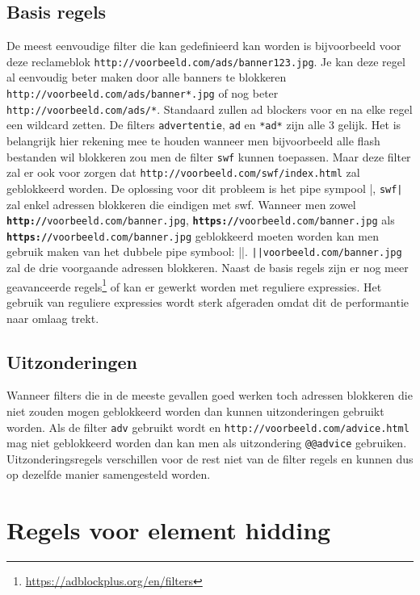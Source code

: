 \documentclass[pdftex,a4paper,12pt,twoside]{report}
\begin{document}
\subsection{Basis regels}
\label{sec Basis regels}
De meest eenvoudige filter die kan gedefinieerd kan worden is bijvoorbeeld voor deze reclameblok \texttt{http://voorbeeld.com/ads/banner123.jpg}. Je kan deze regel al eenvoudig beter maken door alle banners te blokkeren \texttt{http://voorbeeld.com/ads/banner*.jpg} of nog beter\texttt{ http://voorbeeld.com/ads/*}. Standaard zullen ad blockers voor en na elke regel een wildcard zetten. De filters \texttt{advertentie}, \texttt{ad} en \texttt{*ad*} zijn alle 3 gelijk. Het is belangrijk hier rekening mee te houden wanneer men bijvoorbeeld alle flash bestanden wil blokkeren zou men de filter \texttt{swf} kunnen toepassen. Maar deze filter zal er ook voor zorgen dat \texttt{http://voorbeeld.com/swf/index.html} zal geblokkeerd worden. De oplossing voor dit probleem is het pipe sympool |, \texttt{swf|} zal enkel adressen blokkeren die eindigen met swf. Wanneer men zowel \texttt{\textbf{http://}voorbeeld.com/banner.jpg}, \texttt{\textbf{https://}voorbeeld.com/banner.jpg} als \texttt{\textbf{https://}voorbeeld.com/banner.jpg} geblokkeerd moeten worden kan men gebruik maken van het dubbele pipe symbool: ||. \texttt{||voorbeeld.com/banner.jpg} zal de drie voorgaande adressen blokkeren.
Naast de basis regels zijn er nog meer geavanceerde regels\footnote{\url{https://adblockplus.org/en/filters}} of kan er gewerkt worden met reguliere expressies. Het gebruik van reguliere expressies wordt sterk afgeraden omdat dit de performantie naar omlaag trekt.
\subsection{Uitzonderingen}
\label{sec Uitzonderingen}
Wanneer filters die in de meeste gevallen goed werken toch adressen blokkeren die niet zouden mogen geblokkeerd worden dan kunnen uitzonderingen gebruikt worden. Als de filter \texttt{adv} gebruikt wordt en \texttt{http://voorbeeld.com/advice.html} mag niet geblokkeerd worden dan kan men als uitzondering \texttt{@@advice} gebruiken. Uitzonderingsregels verschillen voor de rest niet van de filter regels en kunnen dus op dezelfde manier samengesteld worden.
\section{Regels voor element hidding}
\label{sec:Regels voor element hidding}
\end{document}
